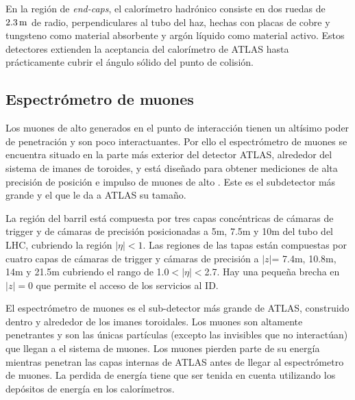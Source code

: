 En la región de \emph{end-caps}, el calorímetro hadrónico consiste en dos ruedas de
$\unit[2.3]{m}$ de radio, perpendiculares al tubo del haz, hechas con placas de cobre y
tungsteno como material absorbente y argón líquido como material activo. Estos
detectores extienden la aceptancia del calorímetro de ATLAS hasta prácticamente
cubrir el ángulo sólido del punto de colisión.


\subsection{Espectrómetro de muones}
\label{sec:espectrometro_muones}

Los muones de alto {\pt} generados en el punto de interacción tienen un altísimo
poder de penetración y son poco interactuantes. Por ello el espectrómetro de
muones \cite{muonTDR} se encuentra situado en la parte más exterior del detector
ATLAS, alrededor del sistema de imanes de toroides, y está diseñado para obtener
mediciones de alta precisión de posición e impulso de muones de alto \pt.
Este es el subdetector más grande y el que le da a ATLAS su tamaño.



La región del barril está compuesta por tres capas concéntricas de cámaras de
trigger y de cámaras de precisión posicionadas a 5m, 7.5m y 10m del tubo del
LHC, cubriendo la región $|\eta|<1$. Las regiones de las tapas están compuestas
por cuatro capas de cámaras de trigger y cámaras de precisión a $|z|$= 7.4m,
10.8m, 14m y 21.5m cubriendo el rango de 1.0$<|\eta|<$2.7. Hay una pequeña
brecha en $|z|=0$ que permite el acceso de los servicios al ID.

El espectrómetro de muones es el sub-detector más grande de ATLAS, construido
dentro y alrededor de los imanes toroidales. Los muones son altamente penetrantes
y son las únicas partículas (excepto las invisibles que no interactúan) que llegan
a el sistema de muones. Los muones pierden parte de su energía mientras penetran
las capas internas de ATLAS antes de llegar al espectrómetro de muones. La perdida
de energía tiene que ser tenida en cuenta utilizando los depósitos de energía
en los calorímetros.

